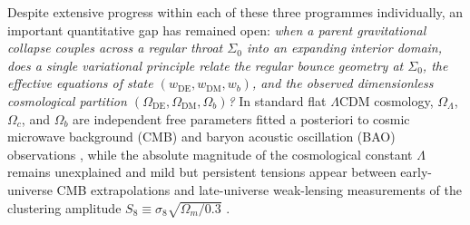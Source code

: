 \documentclass[pdflatex,sn-mathphys-num]{sn-jnl}
\theoremstyle{thmstyleone}
\theoremstyle{thmstyletwo}
\theoremstyle{thmstylethree}
\begin{document}
Despite extensive progress within each of these three programmes individually, an important quantitative gap has remained open: \emph{when a parent gravitational collapse couples across a regular throat $\Sigma_0$ into an expanding interior domain, does a single variational principle relate the regular bounce geometry at $\Sigma_0$, the effective equations of state $(w_{\mathrm{DE}}, w_{\mathrm{DM}}, w_b)$, and the observed dimensionless cosmological partition $(\Omega_{\mathrm{DE}}, \Omega_{\mathrm{DM}}, \Omega_b)$?} In standard flat $\Lambda$CDM cosmology, $\Omega_\Lambda$, $\Omega_c$, and $\Omega_b$ are independent free parameters fitted a posteriori to cosmic microwave background (CMB) and baryon acoustic oscillation (BAO) observations \cite{Planck2018,ACTDR6_2024,DESI2024}, while the absolute magnitude of the cosmological constant $\Lambda$ remains unexplained \cite{Weinberg1989} and mild but persistent tensions appear between early-universe CMB extrapolations and late-universe weak-lensing measurements of the clustering amplitude $S_8 \equiv \sigma_8\sqrt{\Omega_m/0.3}$ \cite{KiDS1000_2021,DESY3_KiDS_2023}.
\end{document}
